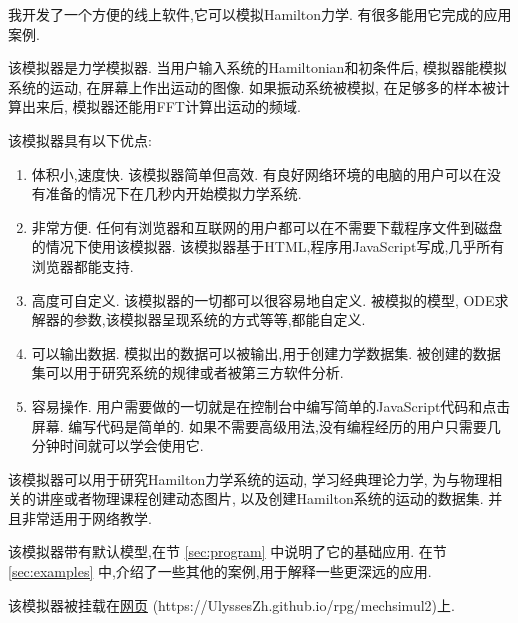 \documentclass[12pt]{article}
\begin{document}
我开发了一个方便的线上软件,它可以模拟Hamilton力学.
有很多能用它完成的应用案例.

该模拟器是力学模拟器.
当用户输入系统的Hamiltonian和初条件后,
模拟器能模拟系统的运动,
在屏幕上作出运动的图像.
如果振动系统被模拟,
在足够多的样本被计算出来后,
模拟器还能用FFT计算出运动的频域.

该模拟器具有以下优点:
\begin{enumerate}
  \item 体积小,速度快.
  该模拟器简单但高效.
  有良好网络环境的电脑的用户可以在没有准备的情况下在几秒内开始模拟力学系统.

  \item 非常方便.
  任何有浏览器和互联网的用户都可以在不需要下载程序文件到磁盘的情况下使用该模拟器.
  该模拟器基于HTML,程序用JavaScript写成,几乎所有浏览器都能支持.

  \item 高度可自定义.
  该模拟器的一切都可以很容易地自定义.
  被模拟的模型, ODE求解器的参数,该模拟器呈现系统的方式等等,都能自定义.

  \item 可以输出数据.
  模拟出的数据可以被输出,用于创建力学数据集.
  被创建的数据集可以用于研究系统的规律或者被第三方软件分析.

  \item 容易操作.
  用户需要做的一切就是在控制台中编写简单的JavaScript代码和点击屏幕.
  编写代码是简单的.
  如果不需要高级用法,没有编程经历的用户只需要几分钟时间就可以学会使用它.
\end{enumerate}

该模拟器可以用于研究Hamilton力学系统的运动,
学习经典理论力学,
为与物理相关的讲座或者物理课程创建动态图片,
以及创建Hamilton系统的运动的数据集.
并且非常适用于网络教学.

该模拟器带有默认模型,在节 \ref{sec:program} 中说明了它的基础应用.
在节 \ref{sec:examples} 中,介绍了一些其他的案例,用于解释一些更深远的应用.

该模拟器被挂载在\href{https://UlyssesZh.github.io/rpg/mechsimul2}{网页} (https://UlyssesZh.github.io/rpg/mechsimul2)上.

\newpage



\end{document}
